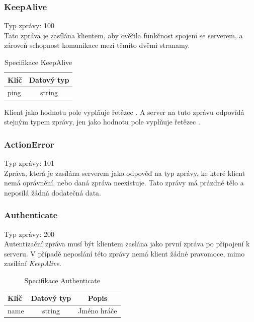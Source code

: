\documentclass[12pt, a4paper]{article}
\begin{document}
    \subsubsection*{KeepAlive}
    Typ zprávy: 100\\

    Tato zpráva je zasílána klientem, aby ověřila funkčnost spojení se serverem, a zároveň schopnost komunikace mezi těmito dvěmi stranamy.

    \begin{table}[H]
        \centering
        \begin{tabular}{|l|c|}
            \hline
            Klíč & Datový typ\\
            \hline
            \hline
            ping & string \\
            \hline
        \end{tabular}
        \caption{Specifikace KeepAlive}
    \end{table}

    Klient jako hodnotu pole  vyplňuje řetězec . A server na tuto zprávu odpovídá stejným typem zprávy, jen jako hodnotu pole  vyplňuje řetězec .

    \subsubsection*{ActionError}
    Typ zprávy: 101\\

    Zpráva, která je zasílána serverem jako odpověď na typ zprávy, ke které klient nemá oprávnění, nebo daná zpráva neexistuje.
    Tato zprávy má prázdné tělo a neposílá žádná dodatečná data.

    \subsubsection*{Authenticate}
    Typ zprávy: 200\\

    Autentizační zpráva musí být klientem zaslána jako první zpráva po připojení k serveru.
    V případě neposlání této zprávy nemá klient žádné pravomoce, mimo zasílání \textit{KeepAlive}.

    \begin{table}[H]
        \centering
        \begin{tabular}{|l|c|c|}
            \hline
            Klíč & Datový typ & Popis\\
            \hline
            \hline
            name & string & Jméno hráče\\
            \hline
        \end{tabular}
        \caption{Specifikace Authenticate}
    \end{table}
\end{document}
